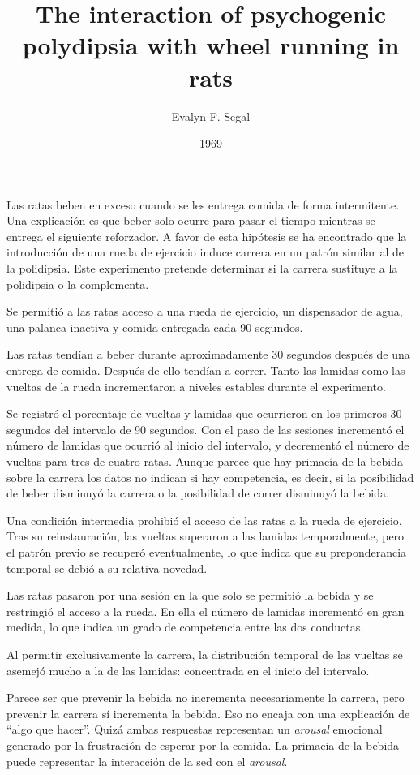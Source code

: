 \documentclass[a4paper,12pt]{article}
\title{The interaction of psychogenic polydipsia with wheel running in rats}
\author{Evalyn F. Segal}
\date{1969}
\begin{document}
{\scshape\bfseries \maketitle}

Las ratas beben en exceso cuando se les entrega comida de forma intermitente. Una explicación es que beber solo ocurre para pasar el tiempo mientras se entrega el siguiente reforzador. A favor de esta hipótesis se ha encontrado que la introducción de una rueda de ejercicio induce carrera en un patrón similar al de la polidipsia. Este experimento pretende determinar si la carrera sustituye a la polidipsia o la complementa.

Se permitió a las ratas acceso a una rueda de ejercicio, un dispensador de agua, una palanca inactiva y comida entregada cada 90 segundos.

Las ratas tendían a beber durante aproximadamente 30 segundos después de una entrega de comida. Después de ello tendían a correr. Tanto las lamidas como las vueltas de la rueda incrementaron a niveles estables durante el experimento.

Se registró el porcentaje de vueltas y lamidas que ocurrieron en los primeros 30 segundos del intervalo de 90 segundos. Con el paso de las sesiones incrementó el número de lamidas que ocurrió al inicio del intervalo, y decrementó el número de vueltas para tres de cuatro ratas. Aunque parece que hay primacía de la bebida sobre la carrera los datos no indican si hay competencia, es decir, si la posibilidad de beber disminuyó la carrera o la posibilidad de correr disminuyó la bebida.

Una condición intermedia prohibió el acceso de las ratas a la rueda de ejercicio. Tras su reinstauración, las vueltas superaron a las lamidas temporalmente, pero el patrón previo se recuperó eventualmente, lo que indica que su preponderancia temporal se debió a su relativa novedad.

Las ratas pasaron por una sesión en la que solo se permitió la bebida y se restringió el acceso a la rueda. En ella el número de lamidas incrementó en gran medida, lo que indica un grado de competencia entre las dos conductas.

Al permitir exclusivamente la carrera, la distribución temporal de las vueltas se asemejó mucho a la de las lamidas: concentrada en el inicio del intervalo.

Parece ser que prevenir la bebida no incrementa necesariamente la carrera, pero prevenir la carrera sí incrementa la bebida. Eso no encaja con una explicación de ``algo que hacer''. Quizá ambas respuestas representan un {\itshape arousal} emocional generado por la frustración de esperar por la comida. La primacía de la bebida puede representar la interacción de la sed con el {\itshape arousal}.
\end{document}
